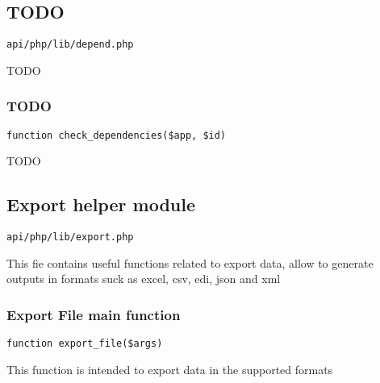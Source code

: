 \documentclass[a4paper]{article}
\begin{document}
\hypertarget{toc435}{}
\subsection{TODO}

\begin{lstlisting}
api/php/lib/depend.php
\end{lstlisting}

TODO

\hypertarget{toc436}{}
\subsubsection{TODO}

\begin{lstlisting}
function check_dependencies($app, $id)
\end{lstlisting}

TODO

\hypertarget{toc437}{}
\subsection{Export helper module}

\begin{lstlisting}
api/php/lib/export.php
\end{lstlisting}

This fie contains useful functions related to export data, allow to generate outputs in formats
suck as excel, csv, edi, json and xml

\hypertarget{toc438}{}
\subsubsection{Export File main function}

\begin{lstlisting}
function export_file($args)
\end{lstlisting}

This function is intended to export data in the supported formats
\end{document}
